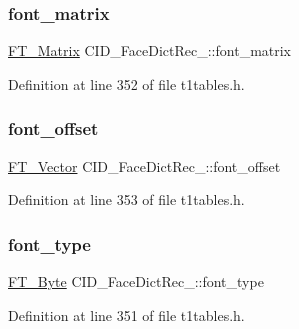 \subsubsection{\texorpdfstring{font\_matrix}{font\_matrix}}
{\footnotesize\ttfamily \mbox{\hyperlink{fttypes_8h_afeacbc4365cf2ad77162b6292f3e3e23}{F\+T\+\_\+\+Matrix}} C\+I\+D\+\_\+\+Face\+Dict\+Rec\+\_\+\+::font\+\_\+matrix}



Definition at line 352 of file t1tables.\+h.

\mbox{\label{struct_c_i_d___face_dict_rec___aa62daa8d45ed4a817f1207cbd452d61e}} 
\subsubsection{\texorpdfstring{font\_offset}{font\_offset}}
{\footnotesize\ttfamily \mbox{\hyperlink{ftimage_8h_ab158b5a7e422acb1968af95db786d018}{F\+T\+\_\+\+Vector}} C\+I\+D\+\_\+\+Face\+Dict\+Rec\+\_\+\+::font\+\_\+offset}



Definition at line 353 of file t1tables.\+h.

\mbox{\label{struct_c_i_d___face_dict_rec___af26e3e5ca3d912c2512e85257b635837}} 
\subsubsection{\texorpdfstring{font\_type}{font\_type}}
{\footnotesize\ttfamily \mbox{\hyperlink{fttypes_8h_a51f26183ca0c9f4af958939648caeccd}{F\+T\+\_\+\+Byte}} C\+I\+D\+\_\+\+Face\+Dict\+Rec\+\_\+\+::font\+\_\+type}



Definition at line 351 of file t1tables.\+h.

\mbox{\label{struct_c_i_d___face_dict_rec___a4db0975dbd1211cb43f4dfc36061b3cb}} 
